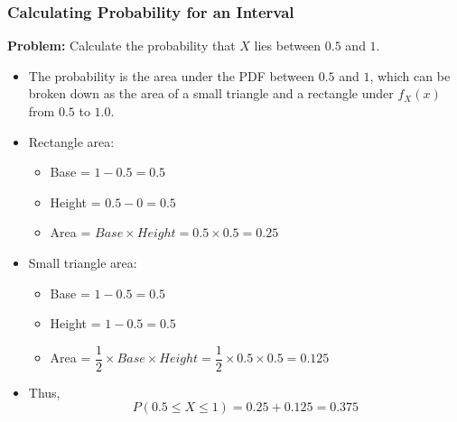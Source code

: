 \documentclass[handout]{beamer} %
\begin{document}
\begin{frame}
\frametitle{Calculating Probability for an Interval}
\textbf{Problem:} Calculate the probability that $X$ lies between $0.5$ and $1$.  \pause
    \begin{itemize}
        \item The probability is the area under the PDF between $0.5$ and $1$, which can be broken down as the area of a small triangle and a rectangle under $f_X(x)$ from $0.5$ to $1.0$. \pause
        \item Rectangle area:
        \begin{itemize}
            \item Base = $1 - 0.5 = 0.5$ \pause
            \item Height = $0.5 - 0 = 0.5$ \pause
            \item Area = $Base \times Height  = 0.5\times 0.5 = 0.25$
        \end{itemize}
        \item Small triangle area:
        \begin{itemize}
            \item Base = $1 - 0.5 = 0.5$ \pause
            \item Height = $1 - 0.5 = 0.5$ \pause
            \item Area = $\dfrac{1}{2}\times Base \times Height  = \dfrac{1}{2}\times 0.5 \times 0.5= 0.125$
        \end{itemize}

        \item Thus,
        \[
        P(0.5 \leq X \leq 1) = 0.25 + 0.125 = 0.375
        \]
    \end{itemize}
\end{frame}
\end{document}
